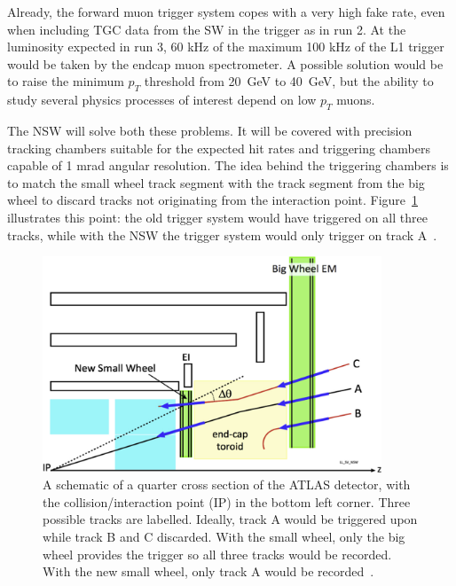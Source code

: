 Already, the forward muon trigger system copes with a very high fake rate, even when including TGC data from the SW in the trigger as in run 2. At the luminosity expected in run 3, 60 kHz of the maximum 100 kHz of the L1 trigger would be taken by the endcap muon spectrometer. A possible solution would be to raise the minimum $p_T$ threshold from \SI{20}{\giga\electronvolt} to \SI{40}{\giga\electronvolt}, but the ability to study several physics processes of interest depend on low $p_T$ muons.

The NSW will solve both these problems. It will be covered with precision tracking chambers suitable for the expected hit rates and triggering chambers capable of 1 mrad angular resolution. The idea behind the triggering chambers is to match the small wheel track segment with the track segment from the big wheel to discard tracks not originating from the interaction point. Figure~\ref{fig:nsw_track_triggering} illustrates this point: the old trigger system would have triggered on all three tracks, while with the NSW the trigger system would only trigger on track A~\cite{nsw_tdr}.


\begin{figure}
    \centering
    \includegraphics[width = 0.9\textwidth]{figures/perez-codina_NSW_tracks.jpg}
    \caption{A schematic of a quarter cross section of the ATLAS detector, with the collision/interaction point (IP) in the bottom left corner. Three possible tracks are labelled. Ideally, track A would be triggered upon while track B and C discarded. With the small wheel, only the big wheel provides the trigger so all three tracks would be recorded. With the new small wheel, only track A would be recorded~\cite{nsw_tdr}.}
    \label{fig:nsw_track_triggering}
\end{figure}

